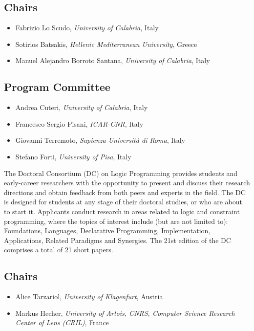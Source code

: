 \documentclass[
]{ceurart}
\begin{document}
\subsection*{Chairs}
\begin{itemize}
\item Fabrizio Lo Scudo, \emph{University of Calabria}, Italy

\item Sotirios Batsakis, \emph{Hellenic Mediterranean University}, Greece

\item Manuel Alejandro Borroto Santana, \emph{University of Calabria}, Italy
\end{itemize}

\subsection*{Program Committee}
\begin{itemize}
  \item Andrea Cuteri, \emph{University of Calabria}, Italy
  \item Francesco Sergio Pisani, \emph{ICAR-CNR}, Italy
  \item Giovanni Terremoto, \emph{Sapienza Università di Roma}, Italy
  \item Stefano Forti, \emph{University of Pisa}, Italy
\end{itemize}



\noindent
The Doctoral Consortium (DC) on Logic Programming provides students and early-career researchers with the opportunity to present and discuss their research directions and obtain feedback from both peers and experts in the field.
The DC is designed for students at any stage of their doctoral studies, or who are about to start it. 
Applicants conduct research in areas related to logic and constraint programming, where the topics of interest include (but are not limited to): Foundations, Languages, Declarative Programming, Implementation, Applications, Related Paradigms and Synergies.
The 21st edition of the DC comprises a total of 21 short papers.

\subsection*{Chairs}
\begin{itemize}
\item Alice Tarzariol, \emph{University of Klagenfurt}, Austria

\item Markus Hecher, \emph{University of Artois, CNRS, Computer Science Research Center of Lens (CRIL)}, France
\end{itemize}
\end{document}
